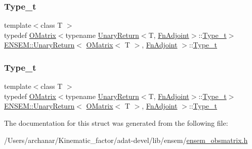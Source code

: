 \subsubsection{\texorpdfstring{Type\_t}{Type\_t}\hspace{0.1cm}{\footnotesize\ttfamily [2/3]}}
{\footnotesize\ttfamily template$<$class T $>$ \\
typedef \mbox{\hyperlink{classENSEM_1_1OMatrix}{O\+Matrix}}$<$typename \mbox{\hyperlink{structENSEM_1_1UnaryReturn}{Unary\+Return}}$<$T, \mbox{\hyperlink{structENSEM_1_1FnAdjoint}{Fn\+Adjoint}}$>$\+::\mbox{\hyperlink{structENSEM_1_1UnaryReturn_3_01OMatrix_3_01T_01_4_00_01FnAdjoint_01_4_aa00f2dd53b3936a34ade7e353b17b138}{Type\+\_\+t}}$>$ \mbox{\hyperlink{structENSEM_1_1UnaryReturn}{E\+N\+S\+E\+M\+::\+Unary\+Return}}$<$ \mbox{\hyperlink{classENSEM_1_1OMatrix}{O\+Matrix}}$<$ T $>$, \mbox{\hyperlink{structENSEM_1_1FnAdjoint}{Fn\+Adjoint}} $>$\+::\mbox{\hyperlink{structENSEM_1_1UnaryReturn_3_01OMatrix_3_01T_01_4_00_01FnAdjoint_01_4_aa00f2dd53b3936a34ade7e353b17b138}{Type\+\_\+t}}}

\mbox{\label{structENSEM_1_1UnaryReturn_3_01OMatrix_3_01T_01_4_00_01FnAdjoint_01_4_aa00f2dd53b3936a34ade7e353b17b138}} 
\subsubsection{\texorpdfstring{Type\_t}{Type\_t}\hspace{0.1cm}{\footnotesize\ttfamily [3/3]}}
{\footnotesize\ttfamily template$<$class T $>$ \\
typedef \mbox{\hyperlink{classENSEM_1_1OMatrix}{O\+Matrix}}$<$typename \mbox{\hyperlink{structENSEM_1_1UnaryReturn}{Unary\+Return}}$<$T, \mbox{\hyperlink{structENSEM_1_1FnAdjoint}{Fn\+Adjoint}}$>$\+::\mbox{\hyperlink{structENSEM_1_1UnaryReturn_3_01OMatrix_3_01T_01_4_00_01FnAdjoint_01_4_aa00f2dd53b3936a34ade7e353b17b138}{Type\+\_\+t}}$>$ \mbox{\hyperlink{structENSEM_1_1UnaryReturn}{E\+N\+S\+E\+M\+::\+Unary\+Return}}$<$ \mbox{\hyperlink{classENSEM_1_1OMatrix}{O\+Matrix}}$<$ T $>$, \mbox{\hyperlink{structENSEM_1_1FnAdjoint}{Fn\+Adjoint}} $>$\+::\mbox{\hyperlink{structENSEM_1_1UnaryReturn_3_01OMatrix_3_01T_01_4_00_01FnAdjoint_01_4_aa00f2dd53b3936a34ade7e353b17b138}{Type\+\_\+t}}}



The documentation for this struct was generated from the following file\+:\begin{DoxyCompactItemize}
\item 
/\+Users/archanar/\+Kinematic\+\_\+factor/adat-\/devel/lib/ensem/\mbox{\hyperlink{adat-devel_2lib_2ensem_2ensem__obsmatrix_8h}{ensem\+\_\+obsmatrix.\+h}}\end{DoxyCompactItemize}
